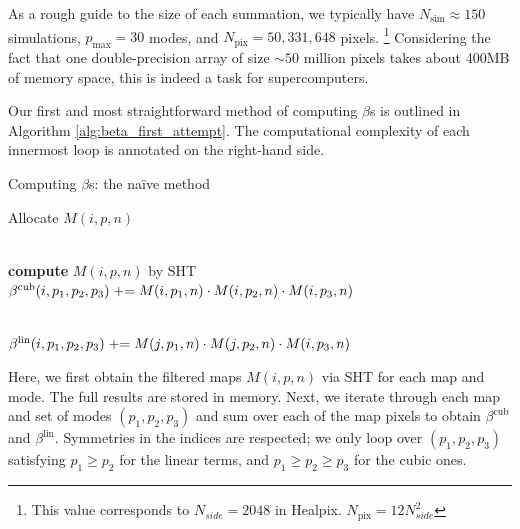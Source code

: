 As a rough guide to the size of each summation, we typically have $N_\text{sim} \approx 150$ simulations, $p_\text{max} = 30$ modes, and $N_\text{pix} = 50,331,648$ pixels. \footnote{This value corresponds to $N_{side} = 2048$ in Healpix. $N_\text{pix} = 12 N_{side}^2$} Considering the fact that one double-precision array of size $\sim 50$ million pixels takes about 400MB of memory space, this is indeed a task for supercomputers.

Our first and most straightforward method of computing $\beta$s is outlined in Algorithm \ref{alg:beta_first_attempt}. The computational complexity of each innermost loop is annotated on the right-hand side.

\begin{algorithm}[htbp]
	\caption{Computing $\beta$s: the na\"ive method}
	\label{alg:beta_first_attempt}
	\begin{algorithmic}[1] %
		\State Allocate $M(i,p,n)$

		\\
				\State \textbf{compute} $M(i,p,n)$ by SHT
			\EndFor
		\EndFor {}
		\\
		
					\State $\beta^\text{cub}(i, p_1, p_2, p_3) \mathrel{+}= M(i,p_1,n) \cdot M(i,p_2,n) \cdot M(i,p_3,n)$
				\EndFor
			\EndFor
		\EndFor

		\\	
						\State $\beta^\text{lin}(i, p_1, p_2, p_3) \mathrel{+}= M(j,p_1,n) \cdot M(j,p_2,n) \cdot M(i,p_3,n)$
					\EndFor
				\EndFor
			\EndFor
		\EndFor

	\end{algorithmic}
\end{algorithm}

Here, we first obtain the filtered maps $M(i,p,n)$ via SHT for each map and mode. The full results are stored in memory. Next, we iterate through each map and set of modes $(p_1, p_2, p_3)$ and sum over each of the map pixels to obtain $\beta^\text{cub}$ and $\beta^\text{lin}$. Symmetries in the indices are respected; we only loop over $(p_1,p_2,p_3)$ satisfying $p_1\ge p_2$ for the linear terms, and $p_1\ge p_2\ge p_3$ for the cubic ones.

